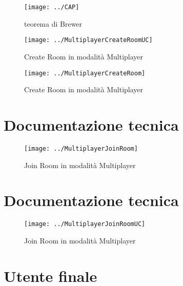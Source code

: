 \documentclass[paper=a4, fontsize=11pt]{scrartcl} %
\numberwithin{equation}{section} %
\numberwithin{figure}{section} %
\numberwithin{table}{section} %
\begin{document}
\begin{figure}
\centering
\texttt{[image: ../CAP]}
\caption{teorema di Brewer}
\label{CAP}
\end{figure}

\begin{figure}
\centering
\texttt{[image: ../MultiplayerCreateRoomUC]}
\caption{Create Room in modalità Multiplayer}
\label{CreateRoomUC}
\end{figure}

\begin{figure}
\centering
\texttt{[image: ../MultiplayerCreateRoom]}
\caption{Create Room in modalità Multiplayer}
\label{CreateRoom}
\end{figure}

\section{Documentazione tecnica}
\begin{figure}
\centering
\texttt{[image: ../MultiplayerJoinRoom]}
\caption{Join Room in modalità Multiplayer}
\label{JoinRoom}
\end{figure}

\section{Documentazione tecnica}
\begin{figure}
\centering
\texttt{[image: ../MultiplayerJoinRoomUC]}
\caption{Join Room in modalità Multiplayer}
\label{JoinRoomUC}
\end{figure}

\section{Utente finale}
\end{document}
